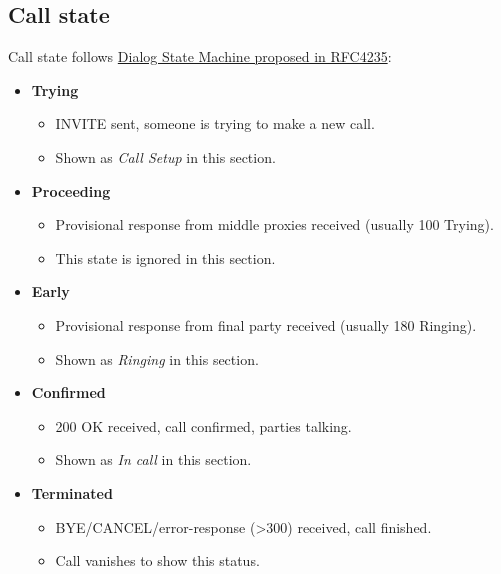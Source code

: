 \documentclass[letterpaper,10pt,english]{sphinxmanual}
\begin{document}
\subsection{Call state}
\label{administration_portal/platform/active_calls:call-state}
Call state follows \href{https://tools.ietf.org/html/rfc4235\#section-3.7.1}{Dialog State Machine proposed in RFC4235}:
\begin{itemize}
\item {} 
\textbf{Trying}
\begin{itemize}
\item {} 
INVITE sent, someone is trying to make a new call.

\item {} 
Shown as \emph{Call Setup} in this section.

\end{itemize}

\item {} 
\textbf{Proceeding}
\begin{itemize}
\item {} 
Provisional response from middle proxies received (usually 100 Trying).

\item {} 
This state is ignored in this section.

\end{itemize}

\item {} 
\textbf{Early}
\begin{itemize}
\item {} 
Provisional response from final party received (usually 180 Ringing).

\item {} 
Shown as \emph{Ringing} in this section.

\end{itemize}

\item {} 
\textbf{Confirmed}
\begin{itemize}
\item {} 
200 OK received, call confirmed, parties talking.

\item {} 
Shown as \emph{In call} in this section.

\end{itemize}

\item {} 
\textbf{Terminated}
\begin{itemize}
\item {} 
BYE/CANCEL/error-response (\textgreater{}300) received, call finished.

\item {} 
Call vanishes to show this status.

\end{itemize}

\end{itemize}
\end{document}
